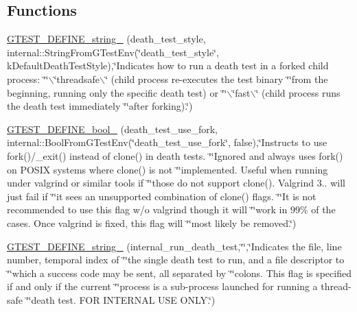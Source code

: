 \subsection*{\-Functions}
\begin{DoxyCompactItemize}
\item 
\hyperlink{namespacetesting_aa36974bb83a6d932b9163c94630b7135}{\-G\-T\-E\-S\-T\-\_\-\-D\-E\-F\-I\-N\-E\-\_\-string\-\_\-} (death\-\_\-test\-\_\-style, internal\-::\-String\-From\-G\-Test\-Env(\char`\"{}death\-\_\-test\-\_\-style\char`\"{}, k\-Default\-Death\-Test\-Style),\char`\"{}\-Indicates how to run a death test in a forked child process\-: \char`\"{}\char`\"{}$\backslash$\char`\"{}threadsafe$\backslash$\char`\"{} (child process re-\/executes the test binary \char`\"{}\char`\"{}from the beginning, running only the specific death test) or \char`\"{}\char`\"{}$\backslash$\char`\"{}fast$\backslash$\char`\"{} (child process runs the death test immediately \char`\"{}\char`\"{}after forking).\char`\"{})
\item 
\hyperlink{namespacetesting_a066dbec0dbe000aa600d344feb9cba62}{\-G\-T\-E\-S\-T\-\_\-\-D\-E\-F\-I\-N\-E\-\_\-bool\-\_\-} (death\-\_\-test\-\_\-use\-\_\-fork, internal\-::\-Bool\-From\-G\-Test\-Env(\char`\"{}death\-\_\-test\-\_\-use\-\_\-fork\char`\"{}, false),\char`\"{}\-Instructs to use fork()/\-\_\-exit() instead of clone() in death tests. \char`\"{}\char`\"{}\-Ignored and always uses fork() on \-P\-O\-S\-I\-X systems where clone() is not \char`\"{}\char`\"{}implemented. \-Useful when running under valgrind or similar tools if \char`\"{}\char`\"{}those do not support clone(). \-Valgrind 3.. will just fail if \char`\"{}\char`\"{}it sees an unsupported combination of clone() flags. \char`\"{}\char`\"{}\-It is not recommended to use this flag w/o valgrind though it will \char`\"{}\char`\"{}work in 99\% of the cases. \-Once valgrind is fixed, this flag will \char`\"{}\char`\"{}most likely be removed.\char`\"{})
\item 
\hyperlink{namespacetesting_1_1internal_a694ac3968feb2504af45c002d6d7dbf8}{\-G\-T\-E\-S\-T\-\_\-\-D\-E\-F\-I\-N\-E\-\_\-string\-\_\-} (internal\-\_\-run\-\_\-death\-\_\-test,\char`\"{}\char`\"{},\char`\"{}\-Indicates the file, line number, temporal index of \char`\"{}\char`\"{}the single death test to run, and a file descriptor to \char`\"{}\char`\"{}which a success code may be sent, all separated by \char`\"{}\char`\"{}colons.  \-This flag is specified if and only if the current \char`\"{}\char`\"{}process is a sub-\/process launched for running a thread-\/safe \char`\"{}\char`\"{}death test.  \-F\-O\-R \-I\-N\-T\-E\-R\-N\-A\-L \-U\-S\-E \-O\-N\-L\-Y.\char`\"{})
\end{DoxyCompactItemize}


